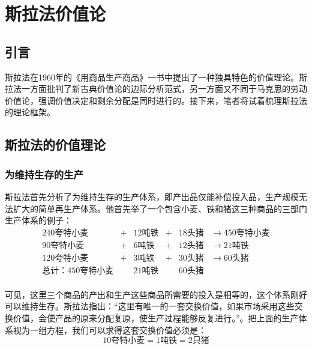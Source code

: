 
\chapter{斯拉法价值论}

\section{引言}

斯拉法在1960年的《用商品生产商品》一书中提出了一种独具特色的价值理论。斯拉法一方面批判了新古典价值论的边际分析范式，另一方面又不同于马克思的劳动价值论，强调价值决定和剩余分配是同时进行的。接下来，笔者将试着梳理斯拉法的理论框架。

\section{斯拉法的价值理论}

\subsection{为维持生存的生产}

斯拉法首先分析了为维持生存的生产体系，即产出品仅能补偿投入品，生产规模无法扩大的简单再生产体系\cite[4]{SiLaFaYongShangPinShengChanShangPinJingJiLiLunPiPanXuLun1963}。他首先举了一个包含小麦、铁和猪这三种商品的三部门生产体系的例子\cite[5]{SiLaFaYongShangPinShengChanShangPinJingJiLiLunPiPanXuLun1963}：
\begin{equation*}
    \begin{aligned}
    240\text{夸特小麦}&+&12\text{吨铁} &+&18\text{头猪} &\rightarrow  450\text{夸特小麦} \\
    90\text{夸特小麦}&+&6\text{吨铁} &+&12\text{头猪} &\rightarrow  21\text{吨铁} \\
    120\text{夸特小麦}&+&3\text{吨铁} &+&30\text{头猪} &\rightarrow  60\text{头猪} \\
    \text{总计：}450\text{夸特小麦}&&21\text{吨铁}&&60\text{头猪}& \\
    \end{aligned}
\end{equation*}

可见，这里三个商品的产出和生产这些商品所需要的投入是相等的，这个体系刚好可以维持生存。斯拉法指出：“这里有唯一的一套交换价值，如果市场采用这些交换价值，会使产品的原来分配复原，使生产过程能够反复进行。”\cite[5]{SiLaFaYongShangPinShengChanShangPinJingJiLiLunPiPanXuLun1963}。把上面的生产体系视为一组方程，我们可以求得这套交换价值必须是\cite[5]{SiLaFaYongShangPinShengChanShangPinJingJiLiLunPiPanXuLun1963}：
\begin{equation*}
    10\text{夸特小麦}=1\text{吨铁}=2\text{只猪}
\end{equation*}

